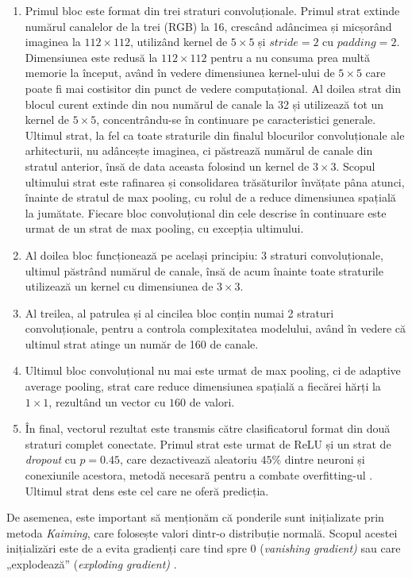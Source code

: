 \begin{enumerate}
    \item Primul bloc este format din trei straturi convoluționale. Primul strat extinde numărul canalelor de la trei (RGB) la 16, crescând adâncimea și micșorând imaginea la $112 \times 112$, utilizând kernel de $5 \times 5$ și $stride = 2$ cu $padding = 2$. Dimensiunea este redusă la $112 \times 112$ pentru a nu consuma prea multă memorie la început, având în vedere dimensiunea kernel-ului de $5 \times 5$ care poate fi mai costisitor din punct de vedere computațional. Al doilea strat din blocul curent extinde din nou numărul de canale la 32 și utilizează tot un kernel de $5\times 5$, concentrându-se în continuare pe caracteristici generale. Ultimul strat, la fel ca toate straturile din finalul blocurilor convoluționale ale arhitecturii, nu adâncește imaginea, ci păstrează numărul de canale din stratul anterior, însă de data aceasta folosind un kernel de $3 \times 3$. Scopul ultimului strat este rafinarea și consolidarea trăsăturilor învățate pâna atunci, înainte de stratul de max pooling, cu rolul de a reduce dimensiunea spațială la jumătate. Fiecare bloc convoluțional din cele descrise în continuare este urmat de un strat de max pooling, cu excepția ultimului. 
    \item Al doilea bloc funcționează pe același principiu: 3 straturi convoluționale, ultimul păstrând numărul de canale, însă de acum înainte toate straturile utilizează un kernel cu dimensiunea de $3 \times 3$.
    \item Al treilea, al patrulea și al cincilea bloc conțin numai 2 straturi convoluționale, pentru a controla complexitatea modelului, având în vedere că ultimul strat atinge un număr de 160 de canale.
    \item Ultimul bloc convoluțional nu mai este urmat de max pooling, ci de adaptive average pooling, strat care reduce dimensiunea spațială a fiecărei hărți la $1 \times 1$, rezultând un vector cu $160$ de valori.
    \item În final, vectorul rezultat este transmis către clasificatorul format din două straturi complet conectate. Primul strat este urmat de ReLU și un strat de \textit{dropout} cu $p=0.45$, care dezactivează aleatoriu $45\%$ dintre neuroni și conexiunile acestora, metodă necesară pentru a combate overfitting-ul \cite{dropout1, dropout2}. Ultimul strat dens este cel care ne oferă predicția.
\end{enumerate}
 
De asemenea, este important să menționăm că ponderile sunt inițializate prin metoda \textit{Kaiming}, care folosește valori dintr-o distribuție normală. Scopul acestei inițializări este de a evita gradienți care tind spre 0 (\textit{vanishing gradient)} sau care „explodează” (\textit{exploding gradient)} 
\cite{kaiming_w_init}.

